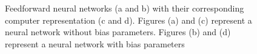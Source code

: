 \documentclass[11pt]{article}
\begin{document}
\begin{figure}[]
	\centering
		\hspace{2mm}

		\hspace{8mm} 
		\caption{Feedforward neural networks (a and b) with their corresponding computer representation (c and d). Figures (a) and (c) represent a neural network without bias parameters. Figures (b) and (d) represent a neural network with bias parameters}
	\label{fig:figures_ffwdnn_DS}	
\end{figure}
\end{document}
